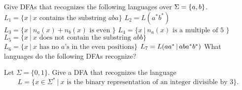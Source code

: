 \begin{exercises}
\problem Give DFAs that recognizes the following languages over $\Sigma =\mbox{$\{a,b\}$}$.
\ppart $L_1= \{ x \ | \ x \mbox{ contains the substring } aba\}$
\ppart $L_2= L(a^*b^*)$
\ppart $L_3= \{ x \ | \ n_a(x)+n_b(x) \mbox{ is even }\}$
\ppart $L_4= \{ x \ | \ n_a(x) \mbox{ is a multiple of 5 }\}$
\ppart $L_5= \{ x \ | \ x \mbox{ does not contain the substring } abb\}$
\ppart $L_6= \{ x \ | \ x \mbox{ has no $a$'s in the even positions} \}$
\ppart $L_7 = L(aa^* \hbox{$\,|\,$}  aba^*b^*)$
\problem What languages do the following DFAs recognize?

\fsafig{1ex}

\fsafig{2ex}


\problem Let $\Sigma=\{0,1\}$. Give a DFA that recognizes the language 
$$ L = \{ x \in \Sigma^* \ | \ x \mbox{ is the binary representation of an integer
divisible by 3}\}.$$ 

\end{exercises}




